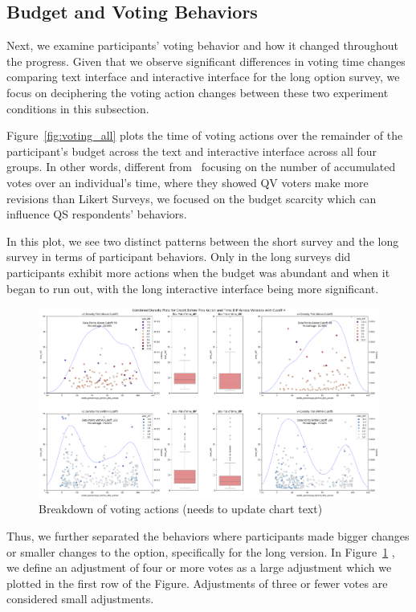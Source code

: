 \subsection{Budget and Voting Behaviors}
Next, we examine participants' voting behavior and how it changed throughout the progress. Given that we observe significant differences in voting time changes comparing text interface and interactive interface for the long option survey, we focus on deciphering the voting action changes between these two experiment conditions in this subsection.

Figure~\ref{fig:voting_all} plots the time of voting actions over the remainder of the participant's budget across the text and interactive interface across all four groups. In other words, different from~\textcite{quarfoot2017quadratic} focusing on the number of accumulated votes over an individual's time, where they showed QV voters make more revisions than Likert Surveys, we focused on the budget scarcity which can influence QS respondents' behaviors.

In this plot, we see two distinct patterns between the short survey and the long survey in terms of participant behaviors. Only in the long surveys did participants exhibit more actions when the budget was abundant and when it began to run out, with the long interactive interface being more significant.

\begin{figure}[ht]
    \centering
    \includegraphics[width=\textwidth]{content/image/results/temp_cut4.png}
    \caption{Breakdown of voting actions (needs to update chart text)}
    \label{fig:voting_v3_v4}
\end{figure}

Thus, we further separated the behaviors where participants made bigger changes or smaller changes to the option, specifically for the long version. In Figure~\ref{fig:voting_v3_v4} , we define an adjustment of four or more votes as a large adjustment which we plotted in the first row of the Figure. Adjustments of three or fewer votes are considered small adjustments.

